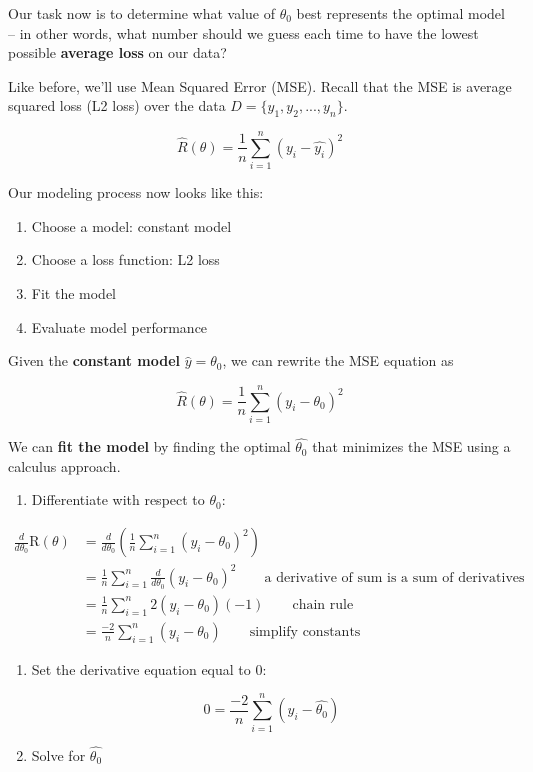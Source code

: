 \documentclass[
  letterpaper,
  DIV=11,
  numbers=noendperiod]{scrreprt}
\providecommand{\tightlist}{%
  \setlength{\itemsep}{0pt}\setlength{\parskip}{0pt}}\usepackage{longtable,booktabs,array}
\begin{document}
Our task now is to determine what value of \(\theta_0\) best represents
the optimal model -- in other words, what number should we guess each
time to have the lowest possible \textbf{average loss} on our data?

Like before, we'll use Mean Squared Error (MSE). Recall that the MSE is
average squared loss (L2 loss) over the data
\(D = \{y_1, y_2, ..., y_n\}\).

\[\hat{R}(\theta) = \frac{1}{n}\sum^{n}_{i=1} (y_i - \hat{y_i})^2 \]

Our modeling process now looks like this:

\begin{enumerate}
\def\labelenumi{\arabic{enumi}.}
\tightlist
\item
  Choose a model: constant model
\item
  Choose a loss function: L2 loss
\item
  Fit the model
\item
  Evaluate model performance
\end{enumerate}

Given the \textbf{constant model} \(\hat{y} = \theta_0\), we can rewrite
the MSE equation as

\[\hat{R}(\theta) = \frac{1}{n}\sum^{n}_{i=1} (y_i - \theta_0)^2 \]

We can \textbf{fit the model} by finding the optimal \(\hat{\theta_0}\)
that minimizes the MSE using a calculus approach.

\begin{enumerate}
\def\labelenumi{\arabic{enumi}.}
\tightlist
\item
  Differentiate with respect to \(\theta_0\):
\end{enumerate}

\begin{align}
\frac{d}{d\theta_0}\text{R}(\theta) & = \frac{d}{d\theta_0}(\frac{1}{n}\sum^{n}_{i=1} (y_i - \theta_0)^2)
\\ &= \frac{1}{n}\sum^{n}_{i=1} \frac{d}{d\theta_0}  (y_i - \theta_0)^2 \quad \quad \text{a derivative of sum is a sum of derivatives}
\\ &= \frac{1}{n}\sum^{n}_{i=1} 2 (y_i - \theta_0) (-1) \quad \quad \text{chain rule}
\\ &= {\frac{-2}{n}}\sum^{n}_{i=1} (y_i - \theta_0) \quad \quad \text{simplify constants}
\end{align}

\begin{enumerate}
\def\labelenumi{\arabic{enumi}.}
\setcounter{enumi}{1}
\item
  Set the derivative equation equal to 0:

  \[
  0 = {\frac{-2}{n}}\sum^{n}_{i=1} (y_i - \hat{\theta_0})
  \]
\item
  Solve for \(\hat{\theta_0}\)
\end{enumerate}
\end{document}
